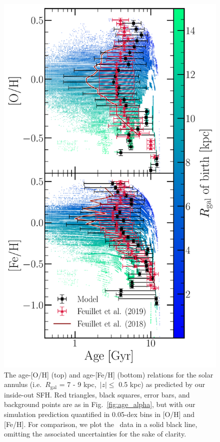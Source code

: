 \documentclass[fleqn, usenatbib]{mnras}
\begin{document}
\begin{figure} 
\centering 
\includegraphics[scale = 0.45]{amr_solar_annulus.pdf} 
\caption{The age-[O/H] (top) and age-[Fe/H] (bottom) relations for the 
solar annulus (i.e.~$R_\text{gal}$ = 7 - 9 kpc,~$\left|z\right|\leq$ 0.5 kpc) 
as predicted by our inside-out SFH. Red triangles, black squares, error bars, 
and background points are as in Fig.~\ref{fig:age_alpha}, 
but with our simulation prediction quantified in 0.05-dex bins in [O/H] and 
[Fe/H]. For comparison, we plot the~\citet{Feuillet2018} data in a solid black 
line, omitting the associated uncertainties for the sake of clarity. } 
\label{fig:amr_solar_annulus} 
\end{figure} 
\end{document}
